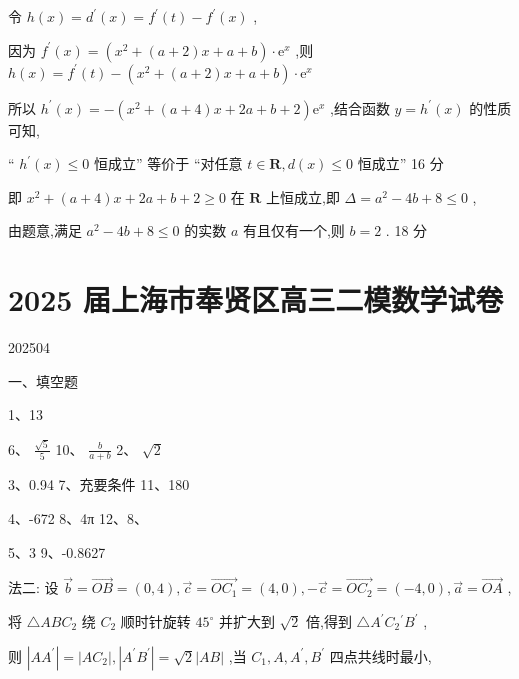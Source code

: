 \documentclass[10pt]{article}
\begin{document}
令 \(h\left( x\right)  = {d}^{\prime }\left( x\right)  = {f}^{\prime }\left( t\right)  - {f}^{\prime }\left( x\right)\) ,

因为 \({f}^{\prime }\left( x\right)  = \left( {{x}^{2} + \left( {a + 2}\right) x + a + b}\right)  \cdot  {\mathrm{e}}^{x}\) ,则 \(h\left( x\right)  = {f}^{\prime }\left( t\right)  - \left( {{x}^{2} + \left( {a + 2}\right) x + a + b}\right)  \cdot  {\mathrm{e}}^{x}\)

所以 \({h}^{\prime }\left( x\right)  =  - \left( {{x}^{2} + \left( {a + 4}\right) x + {2a} + b + 2}\right) {\mathrm{e}}^{x}\) ,结合函数 \(y = {h}^{\prime }\left( x\right)\) 的性质可知,

“ \({h}^{\prime }\left( x\right)  \leq  0\) 恒成立” 等价于 “对任意 \(t \in  \mathbf{R},d\left( x\right)  \leq  0\) 恒成立” 16 分

即 \({x}^{2} + \left( {a + 4}\right) x + {2a} + b + 2 \geq  0\) 在 \(\mathbf{R}\) 上恒成立,即 \(\Delta  = {a}^{2} - {4b} + 8 \leq  0\) ,

由题意,满足 \({a}^{2} - {4b} + 8 \leq  0\) 的实数 \(a\) 有且仅有一个,则 \(b = 2\) . 18 分

\section*{2025 届上海市奉贤区高三二模数学试卷}

202504

一、填空题

1、13

6、 \(\frac{\sqrt{5}}{5}\) 10、 \(\frac{b}{a + b}\) 2、 \(\sqrt{2}\)

3、0.94 7、充要条件 11、180

4、-672 8、4π 12、8、

5、3 9、-0.8627

法二: 设 \(\overrightarrow{b} = \overrightarrow{OB} = \left( {0,4}\right) ,\overrightarrow{c} = \overrightarrow{O{C}_{1}} = \left( {4,0}\right) , - \overrightarrow{c} = \overrightarrow{O{C}_{2}} = \left( {-4,0}\right) ,\overrightarrow{a} = \overrightarrow{OA}\) ,

将 \(\bigtriangleup {AB}{C}_{2}\) 绕 \({C}_{2}\) 顺时针旋转 \({45}^{ \circ  }\) 并扩大到 \(\sqrt{2}\) 倍,得到 \(\bigtriangleup {A}^{\prime }{C}_{2}{}^{\prime }{B}^{\prime }\) ,

则 \(\left| {A{A}^{\prime }}\right|  = \left| {A{C}_{2}}\right| ,\left| {{A}^{\prime }{B}^{\prime }}\right|  = \sqrt{2}\left| {AB}\right|\) ,当 \({C}_{1},A,{A}^{\prime },{B}^{\prime }\) 四点共线时最小,
\end{document}
